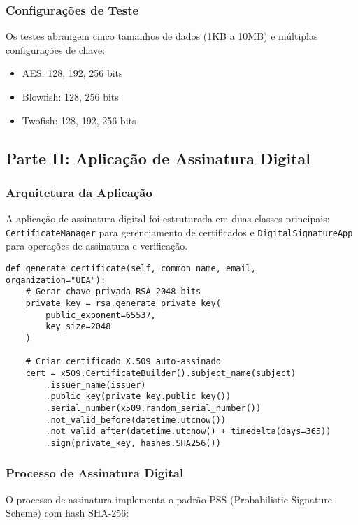 \documentclass[12pt,a4paper,oneside]{article}
\begin{document}
\subsubsection{Configurações de Teste}

Os testes abrangem cinco tamanhos de dados (1KB a 10MB) e múltiplas configurações de chave:
\begin{itemize}
    \item AES: 128, 192, 256 bits
    \item Blowfish: 128, 256 bits
    \item Twofish: 128, 192, 256 bits
\end{itemize}

\subsection{Parte II: Aplicação de Assinatura Digital}

\subsubsection{Arquitetura da Aplicação}

A aplicação de assinatura digital foi estruturada em duas classes principais: \texttt{CertificateManager} para gerenciamento de certificados e \texttt{DigitalSignatureApp} para operações de assinatura e verificação.

\begin{lstlisting}[caption=Geração de certificados ad-hoc]
def generate_certificate(self, common_name, email, organization="UEA"):
    # Gerar chave privada RSA 2048 bits
    private_key = rsa.generate_private_key(
        public_exponent=65537,
        key_size=2048
    )
    
    # Criar certificado X.509 auto-assinado
    cert = x509.CertificateBuilder().subject_name(subject)
        .issuer_name(issuer)
        .public_key(private_key.public_key())
        .serial_number(x509.random_serial_number())
        .not_valid_before(datetime.utcnow())
        .not_valid_after(datetime.utcnow() + timedelta(days=365))
        .sign(private_key, hashes.SHA256())
\end{lstlisting}

\subsubsection{Processo de Assinatura Digital}

O processo de assinatura implementa o padrão PSS (Probabilistic Signature Scheme) com hash SHA-256:
\end{document}
